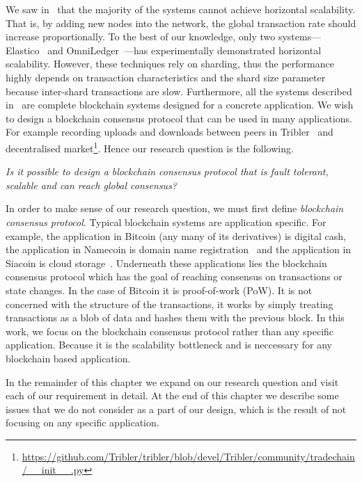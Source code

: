 We saw in~ that the majority of the systems cannot achieve horizontal scalability.
That is, by adding new nodes into the network, the global transaction rate should increase proportionally.
To the best of our knowledge, only two systems---Elastico~\cite{luu2016elastico} and OmniLedger~\cite{kokoris2017omniledger}---has experimentally demonstrated horizontal scalability.
However, these techniques rely on sharding, thus the performance highly depends on transaction characteristics and the shard size parameter because inter-shard transactions are slow.
Furthermore, all the systems described in~ are complete blockchain systems designed for a concrete application.
We wish to design a blockchain consensus protocol that can be used in many applications.
For example recording uploads and downloads between peers in Tribler~\cite{pouwelse2008tribler, multichain} and decentralised market\footnote{\url{https://github.com/Tribler/tribler/blob/devel/Tribler/community/tradechain/__init__.py}}.
Hence our research question is the following.
\begin{displayquote}
\emph{Is it possible to design a blockchain consensus protocol that is fault tolerant, scalable and can reach global consensus?}
\end{displayquote}

In order to make sense of our research question, we must first define \emph{blockchain consensus protocol}.
Typical blockchain systems are application specific.
For example, the application in Bitcoin (any many of its derivatives) is digital cash, the application in Namecoin is domain name registration~\cite{namecoin} and the application in Siacoin is cloud storage~\cite{siacoin}.
Underneath these applications lies the blockchain consensus protocol which has the goal of reaching consensus on transactions or state changes.
In the case of Bitcoin it is proof-of-work (PoW).
It is not concerned with the structure of the transactions,
it works by simply treating transactions as a blob of data and hashes them with the previous block.
In this work, we focus on the blockchain consensus protocol rather than any specific application.
Because it is the scalability bottleneck and is neccessary for any blockchain based application.

In the remainder of this chapter we expand on our research question and visit each of our requirement in detail.
At the end of this chapter we describe some issues that we do not consider as a part of our design,
which is the result of not focusing on any specific application.

